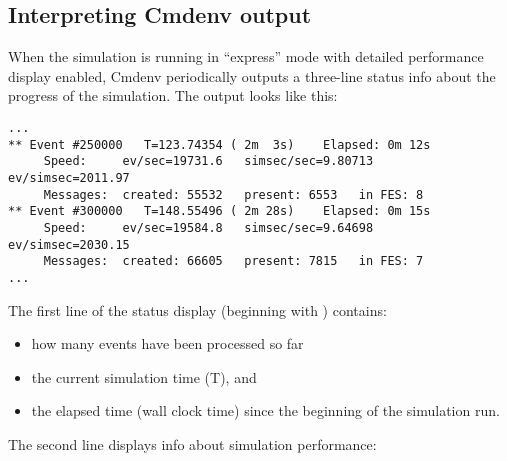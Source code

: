\subsection{Interpreting Cmdenv output}
\label{sec:ch-run-sim:interpreting-cmdenv-output}

When the simulation is running in ``express'' mode with detailed
performance display enabled, Cmdenv periodically outputs a three-line
status info about the progress of the simulation.
The output looks like this:

\begin{verbatim}
...
** Event #250000   T=123.74354 ( 2m  3s)    Elapsed: 0m 12s
     Speed:     ev/sec=19731.6   simsec/sec=9.80713   ev/simsec=2011.97
     Messages:  created: 55532   present: 6553   in FES: 8
** Event #300000   T=148.55496 ( 2m 28s)    Elapsed: 0m 15s
     Speed:     ev/sec=19584.8   simsec/sec=9.64698   ev/simsec=2030.15
     Messages:  created: 66605   present: 7815   in FES: 7
...
\end{verbatim}

The first line of the status display (beginning with \ttt{**})
contains:

\begin{itemize}
   \item{how many events have been processed so far}
   \item{the current simulation time (T), and}
   \item{the elapsed time (wall clock time) since the beginning of the simulation run.}
\end{itemize}

The second line displays info about simulation performance:

